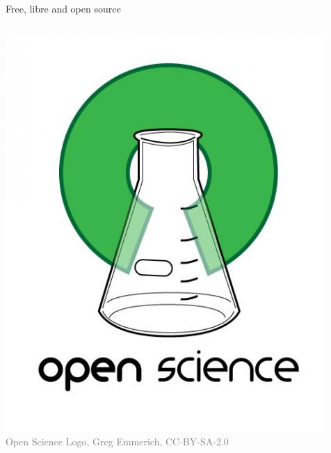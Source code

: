 \documentclass[xcolor={dvipsnames,usenames},beamer,aspectratio=169]{beamer}
\begin{document}
\begin{frame}{Free, libre and open source}
\begin{columns}
\begin{column}{0.3\textwidth}
\begin{center}
  \includegraphics[width=\textwidth]{logos/open_science}
  \\
  \tiny
  \textcolor{gray}{Open Science Logo, Greg Emmerich, CC-BY-SA-2.0}
\end{center}

\end{column}
\end{columns}

\end{frame}
\end{document}

